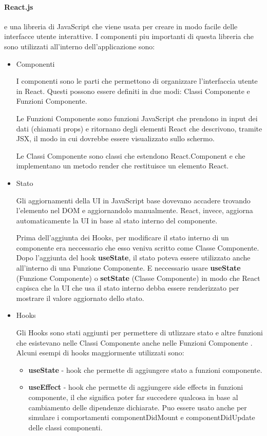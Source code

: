 \documentclass[a4paper,12pt]{report}
\begin{document}
			\paragraph*{React.js} \par e una libreria di JavaScript che viene usata per creare in modo facile delle interfacce utente interattive. 
				I componenti piu importanti di questa libreria che sono utilizzati all'interno dell'applicazione sono:
				\begin{itemize}
				\item Componenti 

				I componenti sono le parti che permettono di organizzare l’interfaccia utente in React. Questi possono essere definiti in due modi: Classi Componente e Funzioni Componente. \cite{componentireact} 

				Le Funzioni Componente sono funzioni JavaScript che prendono in input dei dati (chiamati props) e ritornano degli elementi React che descrivono, tramite JSX, il modo in cui dovrebbe essere visualizzato sullo schermo. \cite{tipicomponenti} 

				Le Classi Componente sono classi che estendono React.Component e che implementano un metodo render che restituisce un elemento React. 

				\item Stato 

				Gli aggiornamenti della UI in JavaScript base dovevano accadere trovando l’elemento nel DOM e aggiornandolo manualmente. React, invece, aggiorna automaticamente la UI in base al stato interno del componente. 

Prima dell’aggiunta dei Hooks, per modificare il stato interno di un componente era neccessario che esso veniva scritto come Classe Componente. Dopo l’aggiunta del hook \textbf{useState}, il stato poteva essere utilizzato anche all’interno di una Funzione Componente. E neccessario usare \textbf{useState} (Funzione Componente) o \textbf{setState} (Classe Componente) in modo che React capisca che la UI che usa il stato interno debba essere renderizzato per mostrare il valore aggiornato dello stato. \cite{statoreact} 

				\item Hooks 

				Gli Hooks sono stati aggiunti per permettere di utlizzare stato e altre funzioni che esistevano nelle Classi Componente anche nelle Funzioni Componente \cite{hooksreact}. Alcuni esempi di hooks maggiormente utilizzati sono: 

				\begin{itemize}
				\item \textbf{useState} - hook che permette di aggiungere stato a funzioni componente.
				\item \textbf{useEffect} - hook che permette di aggiungere side effects in funzioni componente, il che significa poter far succedere qualcosa in base al cambiamento delle dipendenze dichiarate. Puo essere usato anche per simulare i comportamenti componentDidMount e componentDidUpdate delle classi componenti.


\end{itemize}
\end{itemize}
\end{document}
